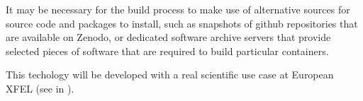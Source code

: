 \begin{task}[
  title=Archiving software environments for reproducible computation,
  id=reproducibility,
  lead=XFEL,
  PM=36,
  wphases={1-36},
  partners={XFEL}
]
\begin{compactitem}
  It may be necessary for the build process to make use of alternative
  sources for source code and packages to install, such as snapshots
  of github repositories that are available on Zenodo, or dedicated
  software archive servers that provide selected pieces of software
  that are required to build particular containers.
  \end{compactitem}

\end{task}

  This techology will be developed with a real scientific use case at European
  XFEL (see  in
  ).

